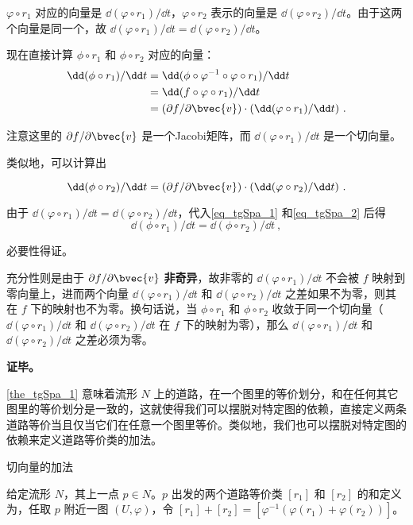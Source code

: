 $\varphi\circ r_1$ 对应的向量是 $\dd(\varphi\circ r_1)/\dd t$，$\varphi\circ r_2$ 表示的向量是 $\dd(\varphi\circ r_2)/\dd t$。由于这两个向量是同一个，故 $\dd(\varphi\circ r_1)/\dd t=\dd(\varphi\circ r_2)/\dd t$。

现在直接计算 $\phi\circ r_1$ 和 $\phi\circ r_2$ 对应的向量：
\begin{equation}\label{eq_tgSpa_1}
\begin{aligned}
\dd(\phi\circ r_1)/\dd t&=\dd(\phi\circ\varphi^{-1}\circ\varphi\circ r_1)/\dd t\\
&=\dd(f\circ\varphi\circ r_1)/\dd t\\
&=(\partial f/\partial\bvec{v})\cdot(\dd(\varphi\circ r_1)/\dd t)~.
\end{aligned}
\end{equation}

注意这里的 $\partial f/\partial\bvec{v}$ 是一个Jacobi矩阵，而 $\dd(\varphi\circ r_1)/\dd t$ 是一个切向量。

类似地，可以计算出

\begin{equation}\label{eq_tgSpa_2}
\dd(\phi\circ r_2)/\dd t=(\partial f/\partial\bvec{v})\cdot(\dd(\varphi\circ r_2)/\dd t)~.
\end{equation}

由于 $\dd(\varphi\circ r_1)/\dd t=\dd(\varphi\circ r_2)/\dd t$，代入\autoref{eq_tgSpa_1} 和\autoref{eq_tgSpa_2} 后得
\begin{equation}
\dd(\phi\circ r_1)/\dd t=\dd(\phi\circ r_2)/\dd t~,
\end{equation}

必要性得证。

充分性则是由于 $\partial f/\partial\bvec{v}$ \textbf{非奇异}，故非零的 $\dd(\varphi\circ r_1)/\dd t$ 不会被 $f$ 映射到零向量上，进而两个向量 $\dd(\varphi\circ r_1)/\dd t$ 和 $\dd(\varphi\circ r_2)/\dd t$ 之差如果不为零，则其在 $f$ 下的映射也不为零。换句话说，当 $\phi\circ r_1$ 和 $\phi\circ r_2$ 收敛于同一个切向量（$\dd(\varphi\circ r_1)/\dd t$ 和 $\dd(\varphi\circ r_2)/\dd t$ 在 $f$ 下的映射为零），那么 $\dd(\varphi\circ r_1)/\dd t$ 和 $\dd(\varphi\circ r_2)/\dd t$ 之差必须为零。


\textbf{证毕。}

\autoref{the_tgSpa_1} 意味着流形 $N$ 上的道路，在一个图里的等价划分，和在任何其它图里的等价划分是一致的，这就使得我们可以摆脱对特定图的依赖，直接定义两条道路等价当且仅当它们在任意一个图里等价。类似地，我们也可以摆脱对特定图的依赖来定义道路等价类的加法。

\begin{definition}{切向量的加法}\label{def_tgSpa_1}

给定流形 $N$，其上一点 $p\in N$。$p$ 出发的两个道路等价类 $[r_1]$ 和 $[r_2]$ 的和定义为，任取 $p$ 附近一图 $(U, \varphi)$，令 $[r_1]+[r_2]=[\varphi^{-1}(\varphi(r_1)+\varphi(r_2))]$。

\end{definition}

